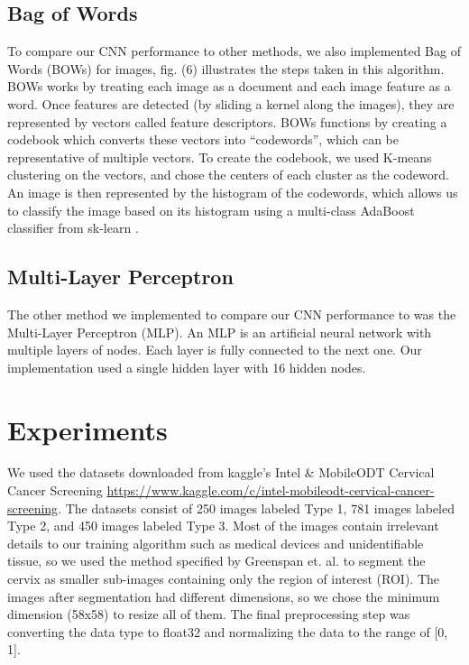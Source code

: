 \documentclass{article}
\begin{document}
\subsection{Bag of Words}
To compare our CNN performance to other methods, we also implemented
Bag of Words (BOWs) for images, fig. (6) illustrates the steps taken
in this algorithm. BOWs works by treating each image as a document and each image feature as a word. Once features are detected (by sliding a kernel along the images), they are represented by vectors called feature descriptors. BOWs functions by creating a codebook which converts these vectors into “codewords”, which can be representative of multiple vectors. To create the codebook, we used K-means clustering on the vectors, and chose the centers of each cluster as the codeword. An image is then represented by the histogram of the codewords, which allows us to classify the image based on its histogram using a multi-class AdaBoost classifier from sk-learn \cite{bag}.


\subsection{Multi-Layer Perceptron}
The other method we implemented to compare our CNN performance to was the Multi-Layer Perceptron (MLP). An MLP is an artificial neural network with multiple layers of nodes. Each layer is fully connected to the next one. Our implementation used a single hidden layer with 16 hidden nodes. 

\section{Experiments}

We used the datasets downloaded from kaggle’s Intel \& MobileODT Cervical Cancer Screening \href{https://www.kaggle.com/c/intel-mobileodt-cervical-cancer-screening}{https://www.kaggle.com/c/intel-mobileodt-cervical-cancer-screening}. The datasets consist of 250 images labeled Type 1, 781 images labeled Type 2, and 450 images labeled Type 3. Most of the images contain irrelevant details to our training algorithm such as medical devices and unidentifiable tissue, so we used the method specified by Greenspan et. al. \cite{autodetect} to segment the cervix as smaller sub-images containing only the region of interest (ROI). The images after segmentation had different dimensions, so we chose the minimum dimension (58x58) to resize all of them. The final preprocessing step was converting the data type to float32 and normalizing the data to the range of [0, 1].  
\end{document}
